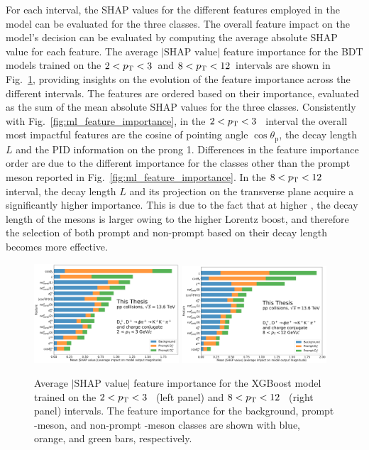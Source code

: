 For each \pt interval, the SHAP values for the different features employed in the model can be evaluated for the three classes. The overall feature impact on the model's decision can be evaluated by computing the average absolute SHAP value for each feature. The average $|\text{SHAP value}|$ feature importance for the BDT models trained on the $2<p_\mathrm{T}<3$~\gevc and $8<p_\mathrm{T}<12$~\gevc intervals are shown in Fig.~\ref{fig:ml_feature_importance_average}, providing insights on the evolution of the feature importance across the different \pt intervals. The features are ordered based on their importance, evaluated as the sum of the mean absolute SHAP values for the three classes. Consistently with Fig.~\ref{fig:ml_feature_importance}, in the \mbox{$2<p_\mathrm{T}<3$~\gevc} interval the overall most impactful features are the cosine of pointing angle $\cos\theta_\mathrm{p}$, the decay length $L$ and the PID information on the prong 1. Differences in the feature importance order are due to the different importance for the classes other than the prompt \ds meson reported in Fig.~\ref{fig:ml_feature_importance}. In the \mbox{$8<p_\mathrm{T}<12$~\gevc} interval, the decay length $L$ and its projection on the transverse plane acquire a significantly higher importance. This is due to the fact that at higher \pt, the decay length of the \ds mesons is larger owing to the higher Lorentz boost, and therefore the selection of both prompt and non-prompt based on their decay length becomes more effective.
\begin{figure}[htb]
    \centering
    \includegraphics[width=0.48\textwidth]{Figures/Chapter 5/SHAP_summary2_3.pdf}
    \includegraphics[width=0.48\textwidth]{Figures/Chapter 5/SHAP_summary8_12.pdf}
    \caption{Average $|\text{SHAP value}|$ feature importance for the XGBoost model trained on the \mbox{$2<p_\mathrm{T}<3$~\gevc} (left panel) and \mbox{$8<p_\mathrm{T}<12$~\gevc} (right panel) intervals. The feature importance for the background, prompt \ds-meson, and non-prompt \ds-meson classes are shown with blue, orange, and green bars, respectively.}
    \label{fig:ml_feature_importance_average}
\end{figure}

